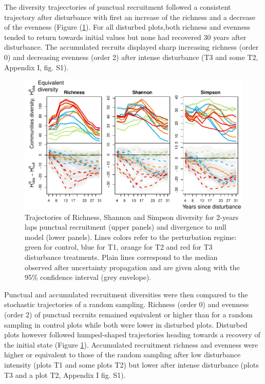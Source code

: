 \documentclass[fleqn,10pt]{ArtEcoFoG} %
\begin{document}
The diversity trajecctories of punctual recruitment followed a
consistent trajectory after disturbance with first an increase of the
richness and a decrease of the evenness (Figure (\ref{fig:DivTraj}). For
all disturbed plots,both richness and evenness tended to return towards
initial values but none had recovered 30 years after disturbance. The
accumulated recruits displayed sharp increasing richness (order 0) and
decreasing evenness (order 2) after intense disturbance (T3 and some T2,
Appendix I, fig. S1).

\begin{figure}

{\centering \includegraphics[width=0.8\linewidth]{RecruitmentTrajectories_files/figure-latex/DivTraj-1} 

}

\caption{Trajectories of Richness, Shannon and Simpson diversity for 2-years laps punctual  recruitment (upper panels) and divergence to null model (lower panels). Lines colors refer to the perturbation regime: green for control, blue for T1, orange for T2 and red for T3 disturbance treatments. Plain lines correspond to the median observed after uncertainty propagation and are given along with the 95\% confidence interval (grey envelope).}\label{fig:DivTraj}
\end{figure}

Punctual and accumulated recruitment diversities were then compared to
the stochastic trajectories of a random sampling. Richness (order 0) and
evenness (order 2) of punctual recruits remained equivalent or higher
than for a random sampling in control plots while both were lower in
disturbed plots. Disturbed plots however followed humped-shaped
trajectories heading towards a recovery of the initial state (Figure
\ref{fig:DivTraj}). Accumulated recruitment richness and evenness were
higher or equivalent to those of the random sampling after low
disturbance intensity (plots T1 and some plots T2) but lower after
intense disturbance (plots T3 and a plot T2, Appendix I fig. S1).
\end{document}
